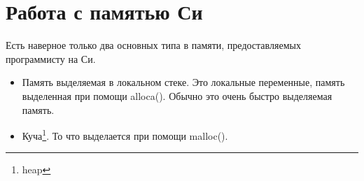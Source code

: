 \chapter{Работа с памятью Си}

Есть наверное только два основных типа в памяти, предоставляемых программисту на Си.

\begin{itemize}
\item
Память выделяемая в локальном стеке. Это локальные переменные, память выделенная при помощи alloca().
Обычно это очень быстро выделяемая память.

\item
Куча\footnote{heap}. То что выделается при помощи malloc().
\end{itemize}








